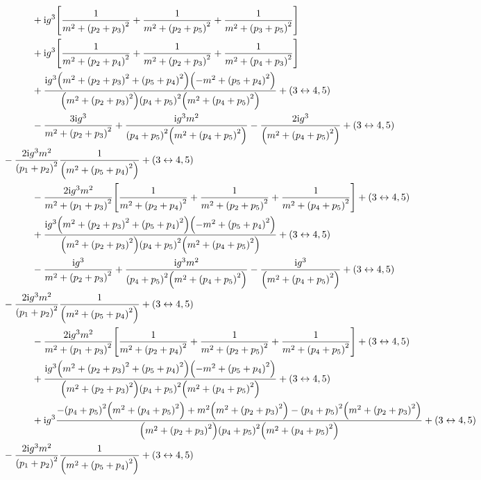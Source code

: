 \begin{align*}
    &\quad\quad\quad+\im g^3\qty[\frac{1}{m^2+\qty(p_2+p_3)^2}+\frac{1}{m^2+\qty(p_2+p_5)^2}+\frac{1}{m^2+\qty(p_3+p_5)^2}]\\
    &\quad\quad\quad+\im g^3\qty[\frac{1}{m^2+\qty(p_2+p_4)^2}+\frac{1}{m^2+\qty(p_2+p_3)^2}+\frac{1}{m^2+\qty(p_4+p_3)^2}]\\
    &\quad\quad\quad+\frac{\im g^3\qty(m^2+\qty(p_2+p_3)^2+\qty(p_5+p_4)^2)\qty(-m^2+\qty(p_5+p_4)^2)}{\qty(m^2+\qty(p_2+p_3)^2)\qty(p_4+p_5)^2\qty(m^2+\qty(p_4+p_5)^2)}+\qty(3\leftrightarrow4,5)\\
    &\quad\quad\quad-\frac{3\im g^3}{m^2+\qty(p_2+p_3)^2}+\frac{\im g^3m^2}{\qty(p_4+p_5)^2\qty(m^2+\qty(p_4+p_5)^2)}-\frac{2\im g^3}{\qty(m^2+\qty(p_4+p_5)^2)}+\qty(3\leftrightarrow4,5)\\
    &-\frac{2\im g^3m^2}{\qty(p_1+p_2)^2}\frac{1}{\qty(m^2+\qty(p_5+p_4)^2)}+\qty(3\leftrightarrow4,5)\\
    &\quad\quad\quad-\frac{2\im g^3m^2}{m^2+\qty(p_1+p_3)^2}\qty[\frac{1}{m^2+\qty(p_2+p_4)^2}+\frac{1}{m^2+\qty(p_2+p_5)^2}+\frac{1}{m^2+\qty(p_4+p_5)^2}]+\qty(3\leftrightarrow4,5)\\
    &\quad\quad\quad+\frac{\im g^3\qty(m^2+\qty(p_2+p_3)^2+\qty(p_5+p_4)^2)\qty(-m^2+\qty(p_5+p_4)^2)}{\qty(m^2+\qty(p_2+p_3)^2)\qty(p_4+p_5)^2\qty(m^2+\qty(p_4+p_5)^2)}+\qty(3\leftrightarrow4,5)\\
    &\quad\quad\quad-\frac{\im g^3}{m^2+\qty(p_2+p_3)^2}+\frac{\im g^3m^2}{\qty(p_4+p_5)^2\qty(m^2+\qty(p_4+p_5)^2)}-\frac{\im g^3}{\qty(m^2+\qty(p_4+p_5)^2)}+\qty(3\leftrightarrow4,5)\\
    &-\frac{2\im g^3m^2}{\qty(p_1+p_2)^2}\frac{1}{\qty(m^2+\qty(p_5+p_4)^2)}+\qty(3\leftrightarrow4,5)\\
    &\quad\quad\quad-\frac{2\im g^3m^2}{m^2+\qty(p_1+p_3)^2}\qty[\frac{1}{m^2+\qty(p_2+p_4)^2}+\frac{1}{m^2+\qty(p_2+p_5)^2}+\frac{1}{m^2+\qty(p_4+p_5)^2}]+\qty(3\leftrightarrow4,5)\\
    &\quad\quad\quad+\frac{\im g^3\qty(m^2+\qty(p_2+p_3)^2+\qty(p_5+p_4)^2)\qty(-m^2+\qty(p_5+p_4)^2)}{\qty(m^2+\qty(p_2+p_3)^2)\qty(p_4+p_5)^2\qty(m^2+\qty(p_4+p_5)^2)}+\qty(3\leftrightarrow4,5)\\
    &\quad\quad\quad+\im g^3\frac{-\qty(p_4+p_5)^2\qty(m^2+\qty(p_4+p_5)^2)+m^2\qty(m^2+\qty(p_2+p_3)^2)-\qty(p_4+p_5)^2\qty(m^2+\qty(p_2+p_3)^2)}{\qty(m^2+\qty(p_2+p_3)^2)\qty(p_4+p_5)^2\qty(m^2+\qty(p_4+p_5)^2)}+\qty(3\leftrightarrow4,5)\\
    &-\frac{2\im g^3m^2}{\qty(p_1+p_2)^2}\frac{1}{\qty(m^2+\qty(p_5+p_4)^2)}+\qty(3\leftrightarrow4,5)\\

\end{align*}
